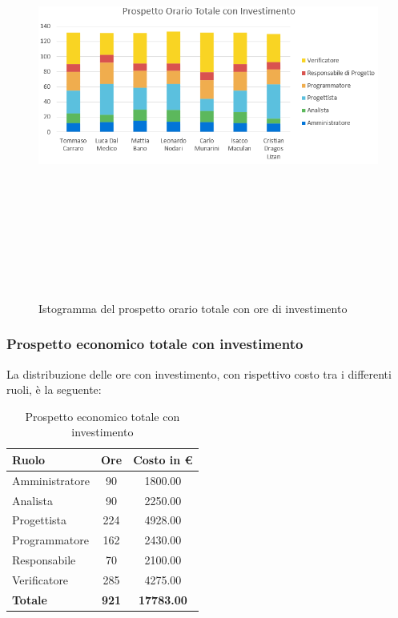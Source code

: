 \begin{figure}[htbp]
\centering
\includegraphics[width=14cm,height=14cm,keepaspectratio]{./img/ProspettoOrario/POTotInv.png}
\caption[Totale con investimento - Istogramma prospetto orario]{Istogramma del prospetto orario totale con ore di investimento}
\end{figure}


\subsubsection{Prospetto economico totale con investimento}
La distribuzione delle ore con investimento, con rispettivo costo tra i differenti ruoli, è la seguente:

\begin{table}[htbp]
\centering
\begin{tabular}{| l c c |}
\hline
\textbf{Ruolo} & \textbf{Ore} & \textbf{Costo in €}\\
\hline
Amministratore & 90 & 1800.00\\
Analista & 90 & 2250.00 \\
Progettista & 224 & 4928.00 \\
Programmatore & 162 & 2430.00\\
Responsabile & 70 & 2100.00\\
Verificatore & 285 & 4275.00\\
\hline
\textbf{Totale} & \textbf{921} & \textbf{17783.00}\\
\hline
\end{tabular}
\caption[Totale con investimento - Prospetto economico]{Prospetto economico totale con investimento}
\end{table}

